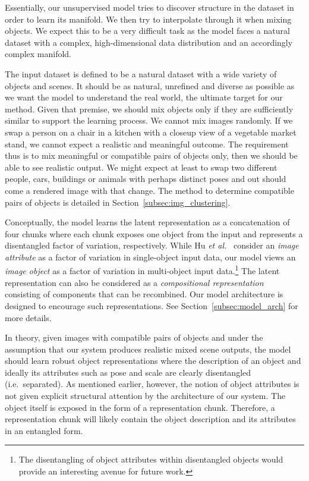 \documentclass[a4paper,12pt]{report}
\begin{document}
Essentially, our unsupervised model tries to discover structure in the dataset in order to learn its manifold. We then try to interpolate through it when mixing objects. We expect this to be a very difficult task as the model faces a natural dataset with a complex, high-dimensional data distribution and an accordingly complex manifold. 

The input dataset is defined to be a natural dataset with a wide variety of objects and scenes. It should be as natural, unrefined and diverse as possible as we want the model to understand the real world, the ultimate target for our method. Given that premise, we should mix objects only if they are sufficiently similar to support the learning process. We cannot mix images randomly. If we swap a person on a chair in a kitchen with a closeup view of a vegetable market stand, we cannot expect a realistic and meaningful outcome. The requirement thus is to mix meaningful or compatible pairs of objects only, then we should be able to see realistic output. We might expect at least to swap two different people, cars, buildings or animals with perhaps distinct poses and out should come a rendered image with that change. The method to determine compatible pairs of objects is detailed in Section~\ref{subsec:img_clustering}. 

Conceptually, the model learns the latent representation as a concatenation of four chunks where each chunk exposes one object from the input and represents a disentangled factor of variation, respectively. While Hu \textit{et al.}~\cite{DisentFacOfVarByMixTh} consider an \textit{image attribute} as a factor of variation in single-object input data, our model views an \textit{image object} as a factor of variation in multi-object input data.\footnote{The disentangling of object attributes within disentangled objects would provide an interesting avenue for future work.} The latent representation can also be considered as a \textit{compositional representation}~\cite{SpatialBDecoder} consisting of components that can be recombined. %
Our model architecture is designed to encourage such representations. See Section~\ref{subsec:model_arch} for more details. 

In theory, given images with compatible pairs of objects and under the assumption that our system produces realistic mixed scene outputs, the model should learn robust object representations where the description of an object and ideally its attributes such as pose and scale are clearly disentangled (i.e.\ separated). As mentioned earlier, however, the notion of object attributes is not given explicit structural attention by the architecture of our system. The object itself is exposed in the form of a representation chunk. Therefore, a representation chunk will likely contain the object description and its attributes in an entangled form.
\end{document}
